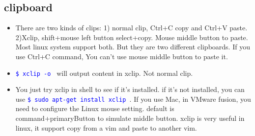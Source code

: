 \documentclass[a4paper,12pt,twoside]{book}
\newcommand{\linuxcommand}[1]{\texttt{\textcolor{blue}{\$ #1 \Pisymbol{psy}{191}}}}
\begin{document}
\subsection{clipboard}
	\begin{itemize}
			\item There are two kinds of clips: 1) normal clip, Ctrl+C copy and Ctrl+V paste. 2)Xclip, shift+mouse left button select+copy. Mouse middle button to paste. Most linux system support both. But they are two different clipboards. If you use Ctrl+C command, You can't use mouse middle button to paste it.
			
			\item \linuxcommand{xclip -o} will output content in xclip. Not normal clip.
					
			\item You just try xclip in shell to see if it's installed. if it's not installed, you can use \linuxcommand{sudo apt-get install xclip}. If you use Mac, in VMware fusion, you need to configure the Linux mouse setting.  default is command+primaryButton to simulate middle button.  xclip is very useful in linux, it support copy from a vim and paste to another vim.  

	\end{itemize}
\end{document}
